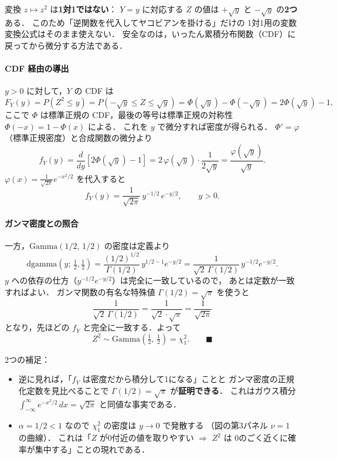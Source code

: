 \documentclass[lualatex,ja=standard,a4paper,12pt]{bxjsarticle}
\begin{document}
\begin{warningbox}
変換 $z \mapsto z^2$ は\textbf{1対1ではない}：
$Y = y$ に対応する $Z$ の値は $+\sqrt{y}$ と $-\sqrt{y}$ の\textbf{2つ}ある．
このため「逆関数を代入してヤコビアンを掛ける」だけの
1対1用の変数変換公式はそのまま使えない．
安全なのは，いったん累積分布関数（CDF）に戻ってから微分する方法である．
\end{warningbox}

\paragraph{CDF 経由の導出}
$y > 0$ に対して，$Y$ の CDF は
\[
  F_Y(y) = P(Z^2 \leq y)
         = P(-\sqrt{y} \leq Z \leq \sqrt{y})
         = \Phi(\sqrt{y}) - \Phi(-\sqrt{y})
         = 2\Phi(\sqrt{y}) - 1,
\]
ここで $\Phi$ は標準正規の CDF，最後の等号は標準正規の対称性
$\Phi(-x) = 1 - \Phi(x)$ による．
これを $y$ で微分すれば密度が得られる．
$\Phi' = \varphi$（標準正規密度）と合成関数の微分より
\[
  f_Y(y) = \frac{d}{dy}\left[2\Phi(\sqrt{y}) - 1\right]
         = 2\,\varphi(\sqrt{y}) \cdot \frac{1}{2\sqrt{y}}
         = \frac{\varphi(\sqrt{y})}{\sqrt{y}}.
\]
$\varphi(x) = \frac{1}{\sqrt{2\pi}} e^{-x^2/2}$ を代入すると
\[
  f_Y(y)
  = \frac{1}{\sqrt{2\pi}}\, y^{-1/2}\, e^{-y/2},
  \qquad y > 0.
\]

\paragraph{ガンマ密度との照合}
一方，$\mathrm{Gamma}(1/2,\, 1/2)$ の密度は定義より
\[
  \mathrm{dgamma}\!\left(y;\, \tfrac12, \tfrac12\right)
  = \frac{(1/2)^{1/2}}{\Gamma(1/2)}\, y^{1/2 - 1} e^{-y/2}
  = \frac{1}{\sqrt{2}\,\Gamma(1/2)}\, y^{-1/2} e^{-y/2}.
\]
$y$ への依存の仕方（$y^{-1/2} e^{-y/2}$）は完全に一致しているので，
あとは定数が一致すればよい．
ガンマ関数の有名な特殊値 $\Gamma(1/2) = \sqrt{\pi}$ を使うと
\[
  \frac{1}{\sqrt{2}\,\Gamma(1/2)}
  = \frac{1}{\sqrt{2}\cdot\sqrt{\pi}}
  = \frac{1}{\sqrt{2\pi}}
\]
となり，先ほどの $f_Y$ と完全に一致する．よって
\[
  Z^2 \sim \mathrm{Gamma}\!\left(\tfrac12,\, \tfrac12\right) = \chi^2_1.
  \qquad \blacksquare
\]

\begin{pointbox}
2つの補足：
\begin{itemize}
  \item 逆に見れば，「$f_Y$ は密度だから積分して1になる」ことと
        ガンマ密度の正規化定数を見比べることで
        $\Gamma(1/2) = \sqrt{\pi}$ が\textbf{証明できる}．
        これはガウス積分 $\int_{-\infty}^{\infty} e^{-x^2/2}\,dx = \sqrt{2\pi}$
        と同値な事実である．
  \item $\alpha = 1/2 < 1$ なので $\chi^2_1$ の密度は $y \to 0$ で発散する
        （図の第3パネル $\nu=1$ の曲線）．
        これは「$Z$ が0付近の値を取りやすい $\Rightarrow$ $Z^2$ は
        0のごく近くに確率が集中する」ことの現れである．
\end{itemize}
\end{pointbox}
\end{document}
